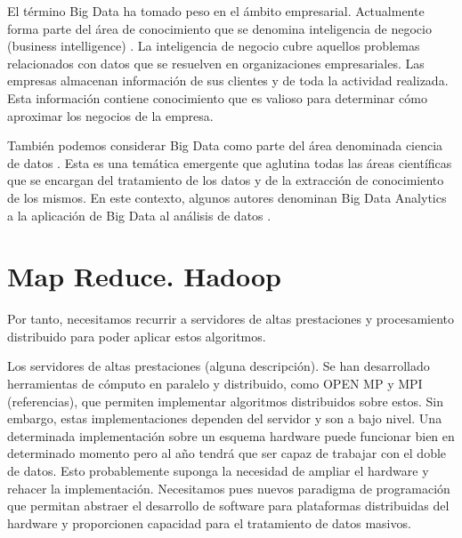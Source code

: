\documentclass[10pt]{article}
\begin{document}
	El término Big Data ha tomado peso en el ámbito empresarial. Actualmente forma parte del área de conocimiento que se denomina inteligencia de negocio (business intelligence) \cite{business-intelligence}. La inteligencia de negocio cubre aquellos problemas relacionados con datos que se resuelven en organizaciones empresariales. Las empresas almacenan información de sus clientes y de toda la actividad realizada. Esta información contiene conocimiento que es valioso para determinar cómo aproximar los negocios de la empresa. 

	También podemos considerar Big Data como parte del área denominada ciencia de datos \cite{data-science}. Esta es una temática emergente que aglutina todas las áreas científicas que se encargan del tratamiento de los datos y de la extracción de conocimiento de los mismos. En este contexto, algunos autores denominan Big Data Analytics a la aplicación de Big Data al análisis de datos \cite{big-data-trends}. 


\section{Map Reduce. Hadoop} \label{sec:map-reduce}

	Por tanto, necesitamos recurrir a servidores de altas prestaciones y procesamiento distribuido para poder aplicar estos algoritmos.
	
	Los servidores de altas prestaciones (alguna descripción). Se han desarrollado herramientas de cómputo en paralelo y distribuido, como OPEN MP y MPI (referencias), que permiten implementar algoritmos distribuidos sobre estos. Sin embargo, estas implementaciones dependen del servidor y son a bajo nivel. Una determinada implementación sobre un esquema hardware puede funcionar bien en determinado momento pero al año tendrá que ser capaz de trabajar con el doble de datos. Esto probablemente suponga la necesidad de ampliar el hardware y rehacer la implementación. Necesitamos pues nuevos paradigma de programación que permitan abstraer el desarrollo de software para plataformas distribuidas del hardware y proporcionen capacidad para el tratamiento de datos masivos.


\end{document}
